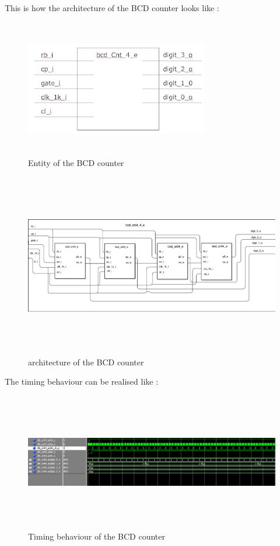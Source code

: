 \documentclass[12pt,a4paper]{article}
\begin{document}
This is how the architecture of the BCD counter looks like :\\
\begin{figure}[H]
\centering
\includegraphics[width=8cm,height=6cm]{bcdCntE.PNG}
\caption{Entity of the BCD counter}
\label{Entity of the BCD counter}
\end{figure}

\begin{figure}[H]
\centering
\includegraphics[width=16cm,height=8cm]{bcdcnt4arc.PNG}
\caption{architecture of the BCD counter}
\label{architecture of the BCD counter}
\end{figure}








The timing behaviour can be realised like :\\
\begin{figure}[H]
\centering
\includegraphics[width=16cm,height=6cm]{bcdcounter.PNG}
\caption{Timing behaviour of the BCD counter}
\label{Timing behaviour of the BCD counter}
\end{figure}
\end{document}
